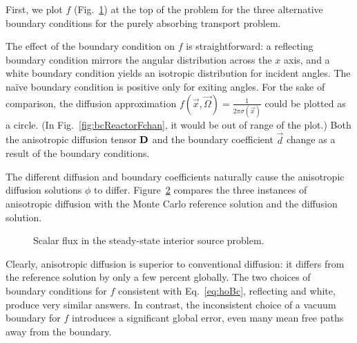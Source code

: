 First, we plot $f$ (Fig.~\ref{fig:bcReactorF}) at the top of the problem for
the three alternative boundary conditions for the purely absorbing transport
problem.
%
\begin{figure}[tb]
  \centering
  \subfloat[$f(2.5,10,\omega)$]{%
    \hspace{-.25in}%
   \label{fig:bcReactorFchan}%
  }%
  \subfloat[$f(1.5,10,\omega)$]{%
    \hspace{-.25in}%
    
  }%
  \label{fig:bcReactorF}
\end{figure}
%
The effect of the boundary condition on $f$ is straightforward: a reflecting boundary
condition mirrors the angular distribution across the $x$ axis, and a white
boundary condition yields an isotropic distribution for incident angles. The
na\"ive boundary condition is positive only for exiting angles. For the sake of
comparison, the diffusion approximation $f(\vec{x},\vec{\Omega}) =
\frac{1}{2\pi \sigma(\vec{x})}$ could be plotted as a circle. (In
Fig.~\ref{fig:bcReactorFchan}, it would be out of range of the plot.) Both the
anisotropic diffusion tensor $\mathbf{D}$ and the boundary coefficient
$\vec{d}$ change as a result of the boundary conditions.

The different diffusion and boundary coefficients naturally cause the
anisotropic diffusion solutions $\phi$ to differ. Figure~\ref{fig:bcReactorFlux}
compares the three instances of anisotropic diffusion with the Monte Carlo
reference solution and the diffusion solution.

\begin{figure}[htb]
  \centering
  \hspace{-.25in}%
  
  \caption{Scalar flux in the steady-state interior source problem.}
  \label{fig:bcReactorFlux}
\end{figure}

Clearly, anisotropic diffusion is superior to conventional diffusion: it differs
from the reference solution by only a few percent globally. The two choices of
boundary conditions for $f$ consistent with Eq.~\eqref{eq:hoBc}, reflecting and
white, produce very similar answers. In contrast, the inconsistent choice of a
vacuum boundary for $f$ introduces a significant global error, even many mean
free paths away from the boundary.


